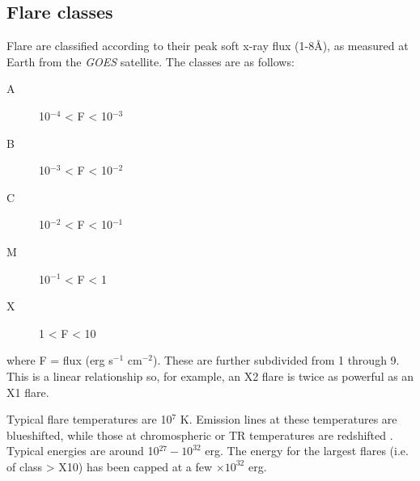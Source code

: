 \subsection{Flare classes}

Flare are classified according to their peak
soft x-ray flux (1-8\AA{}), as
measured at Earth from the \textit{GOES} satellite.
The classes are as follows:
\begin{description}
    \item [A] 10$^{−4}$ < F < 10$^{−3}$
    \item [B] 10$^{−3}$ < F < 10$^{−2}$
    \item [C] 10$^{−2}$ < F < 10$^{−1}$
    \item [M] 10$^{−1}$ < F < 1
    \item [X] 1 < F < 10
\end{description}
where F = flux (erg s$^{-1}$ cm$^{−2}$).
These are further subdivided from 1 through 9.
This is a linear relationship so, for example, an X2 flare is twice as powerful
as an X1 flare.

Typical flare temperatures are 10$^{7}$ K.
Emission lines at these temperatures are blueshifted, while those at
chromospheric or TR temperatures are redshifted
\citep{Brosius2016}.
Typical energies are around 10$^{27}−10^{32}$ erg.
The energy for the largest flares (i.e. of class > X10) has
been capped at a few $\times 10^{32}$ erg.



%

